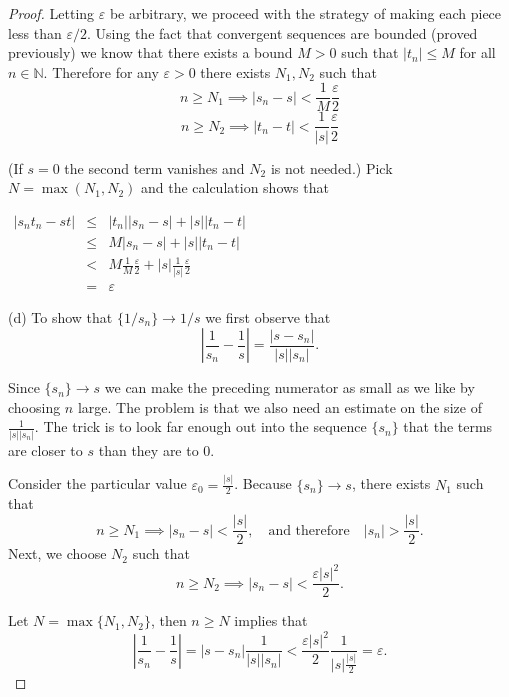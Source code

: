\begin{proof}
Letting $\varepsilon$ be arbitrary, we proceed with the strategy of making each piece less than $\varepsilon/2$.  Using the fact that convergent sequences are bounded (proved previously) we know that there exists a bound $M>0$ such that $|t_n|\leq M$ for all $n \in \mathbb{N}$.  Therefore for any $\varepsilon >0$ there exists $N_1, N_2$ such that 
\[n\geq N_1 \implies |s_n - s| <  \frac{1}{M}\frac{\varepsilon}{2}\]
\[n\geq N_2 \implies |t_n - t| <  \frac{1}{|s|}\frac{\varepsilon}{2}\]

(If $s = 0$ the second term vanishes and $N_2$ is not needed.)  Pick $N = \max(N_1, N_2)$ and the calculation shows that 

\smallskip

$\begin{array} {lcl} 
|s_n t_n  - st|& \leq &|t_n||s_n - s| + |s||t_n - t| \\ 
& \leq & M|s_n - s| + |s||t_n - t|\\
& <	&  M\frac{1}{M}\frac{\varepsilon}{2} + |s|\frac{1}{|s|}\frac{\varepsilon}{2}\\
&=& \varepsilon
    \end{array}$

\smallskip



(d) To show that $\{1/s_n\} \to 1/s$ we first observe that 
\[\left\lvert \frac{1}{s_n} - \frac{1}{s} \right\rvert = \frac{|s-s_n|} {|s||s_n|}.\]

Since $\{s_n\} \to s$ we can make the preceding numerator as small as we like by choosing $n$ large.  The problem is that we also need an estimate on the size of $\frac{1} {|s||s_n|}$. The trick is to look far enough out into the sequence $\{s_n\}$ that the terms are closer to $s$ than they are to 0.

Consider the particular value $\varepsilon_0 = \frac{|s|}{2}$.  Because $\{s_n\} \to s$, there exists $N_1$ such that 
\[n \geq N_1 \implies |s_n - s|<\frac{|s|}{2}, \quad \text{and therefore} \quad |s_n| > \frac{|s|}{2}.\]
Next, we choose $N_2$ such that 
\[n \geq N_2 \implies |s_n -s| < \frac{\varepsilon |s|^2}{2}.\]

Let $N=\max\{N_1, N_2\}$, then $n \geq N$ implies that
\[\left\lvert \frac{1}{s_n} - \frac{1}{s} \right\rvert = |s-s_n|\frac{1} {|s||s_n|} < \frac{\varepsilon |s|^2}{2} \frac{1}{|s|\frac{|s|}{2}} = \varepsilon.\]



\end{proof}

